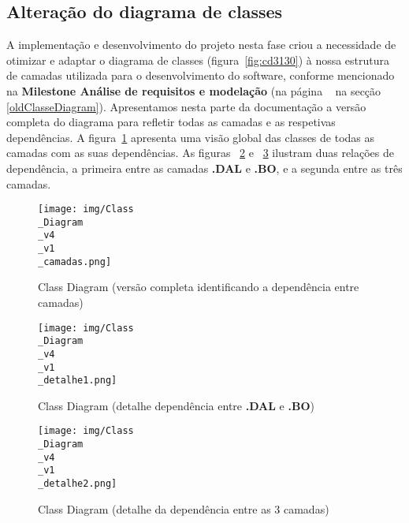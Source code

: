 \subsection{Alteração do diagrama de classes}\label{novoClasseDiagram}

A implementação e desenvolvimento do projeto nesta fase criou a necessidade de otimizar e adaptar o diagrama de classes (figura~\ref{fig:cd3130}) à nossa estrutura de camadas utilizada para o desenvolvimento do software, conforme mencionado na \textbf{Milestone Análise de requisitos e modelação} (na página ~\pageref{oldClasseDiagram} na secção \ref{oldClasseDiagram}). Apresentamos nesta parte da documentação a versão completa do diagrama para refletir todas as camadas e as respetivas dependências. A figura~\ref{fig:cdNovoAll0} apresenta uma visão global das classes de todas as camadas com as suas dependências. As figuras ~\ref{fig:cdNovoAll1} e ~\ref{fig:cdNovoAll2} ilustram duas relações de dependência, a primeira entre as camadas \textbf{.DAL} e \textbf{.BO}, e a segunda entre as três camadas.


\begin{figure}[htb]
	\centering
	\texttt{[image: img/Class\\\_Diagram\\\_v4\\\_v1\\\_camadas.png]}  %
	\caption{Class Diagram (versão completa identificando a dependência entre camadas)}
	\label{fig:cdNovoAll0}
\end{figure}

\begin{figure}[htb]
	\centering
	\texttt{[image: img/Class\\\_Diagram\\\_v4\\\_v1\\\_detalhe1.png]}  %
	\caption{Class Diagram (detalhe dependência entre \textbf{.DAL} e \textbf{.BO})}
	\label{fig:cdNovoAll1}
\end{figure}

\begin{figure}[htb]
	\centering
	\texttt{[image: img/Class\\\_Diagram\\\_v4\\\_v1\\\_detalhe2.png]}  %
	\caption{Class Diagram (detalhe da dependência entre as 3 camadas)}
	\label{fig:cdNovoAll2}
\end{figure}


